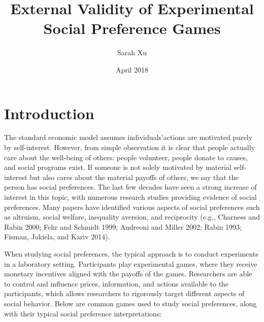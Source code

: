 \documentclass[12pt]{article}
\title{External Validity of Experimental Social Preference Games}
\author{Sarah Xu}
\date{April 2018}
\begin{document}
\maketitle

\section{Introduction}

The standard economic model assumes individuals\rq actions are motivated purely by self-interest. However, from simple observation it is clear that people actually care about the well-being of others: people volunteer, people donate to causes, and social programs exist. If someone is not solely motivated by material self-interest but also cares about the material payoffs of others, we say that the person has social preferences. The last few decades have seen a strong increase of interest in this topic, with numerous research studies providing evidence of social preferences. Many papers have identified various aspects of social preferences such as altruism, social welfare, inequality aversion, and reciprocity (e.g., Charness and Rabin 2000; Fehr and Schmidt 1999; Andreoni and Miller 2002; Rabin 1993; Fisman, Jakiela, and Kariv 2014). 
 
When studying social preferences, the typical approach is to conduct experiments in a laboratory setting. Participants play experimental games, where they receive monetary incentives aligned with the payoffs of the games. Researchers are able to control and influence prices, information, and actions available to the participants, which allows researchers to rigorously target different aspects of social behavior. Below are common games used to study social preferences, along with their typical social preference interpretations: 
\end{document}

